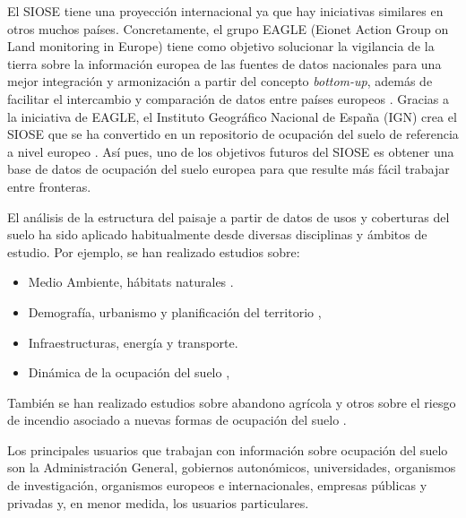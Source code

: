 El SIOSE tiene una proyección internacional ya que hay iniciativas similares en otros muchos países. Concretamente, el grupo EAGLE (Eionet Action Group on Land monitoring in Europe) tiene como objetivo solucionar la vigilancia de la tierra sobre la información europea de las fuentes de datos nacionales para una mejor integración y armonización a partir del concepto \textit{bottom-up}, además de facilitar el intercambio y comparación de datos entre países europeos \citep{Arnold2013}. Gracias a la iniciativa de EAGLE, el Instituto Geográfico Nacional de España (IGN) crea el SIOSE que se ha convertido en un repositorio de ocupación del suelo de referencia a nivel europeo \citep{EquipoTecnicoNacionalSIOSE2015}. Así pues, uno de los objetivos futuros del SIOSE es obtener una base de datos de ocupación del suelo europea para que resulte más fácil trabajar entre fronteras.

El análisis de la estructura del paisaje a partir de datos de usos y coberturas del suelo ha sido aplicado habitualmente desde diversas disciplinas y ámbitos de estudio. Por ejemplo, se han realizado estudios sobre:

\begin{itemize}
\item Medio Ambiente, hábitats naturales \citep{Gine2014,Hamilton2009,Hebeisen2008}\citep{GimenezFont2010,Lin2014,Brennan2005}.
\item Demografía, urbanismo y planificación del territorio \citep{Aguilera2011}, \citep{Blaschke1999,Jacquin2008,Tudor2014,Aguilera2010,Prastacos2017}
\item Infraestructuras, energía y transporte.
\item Dinámica de la ocupación del suelo \citep{VanderKwast2011,Dunk2011,Herold2002}, \citep{Roces-Diaz2014,Aguilera2012,Liu2016,Rodriguez-Rodriguez2017}
\end{itemize}

También se han realizado estudios sobre abandono agrícola \citep{Zaragozi2011} y otros sobre el riesgo de incendio asociado a nuevas formas de ocupación del suelo \citet{Vazquez2017}.

Los principales usuarios que trabajan con información sobre ocupación del suelo son la Administración General, gobiernos autonómicos, universidades, organismos de investigación, organismos europeos e internacionales, empresas públicas y privadas y, en menor medida, los usuarios particulares.

